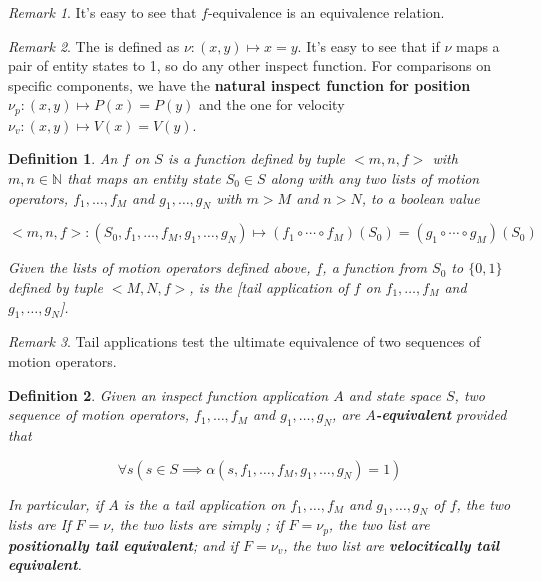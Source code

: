 \documentclass{book}
\newtheorem{definition}{Definition}
\theoremstyle{definition}\newtheorem{mechanism}{Mechanism}
\theoremstyle{remark}\newtheorem*{remark}{Remark}
\begin{document}
\begin{remark}
	It's easy to see that $f$-equivalence is an equivalence relation.
\end{remark}

\begin{remark}
	The  is defined as $\nu : (x, y) \mapsto x = y$. It's easy to see that if $\nu$ maps a pair of entity states to 1, so do any other inspect function. For comparisons on specific components, we have the {\bf{natural inspect function for position}} $\nu_p: (x, y) \mapsto P(x) = P(y)$ and the one for velocity $\nu_v: (x, y)\mapsto V(x) = V(y)$.
\end{remark}

\begin{definition}
	An  $f$ on $S$ is a function defined by tuple $<m, n, f>$ with $m, n \in \mathbb{N}$ that maps an entity state $S_0\in S$ along with any two lists of motion operators, $f_1, \dots, f_M$ and $g_1, \dots, g_N$ with $m > M$ and $n > N$, to a boolean value
	
	\begin{equation*}
		<m, n, f>: (S_0, f_1, \dots, f_M, g_1, \dots, g_N) \mapsto (f_1 \circ \cdots \circ f_M)(S_0) = (g_1 \circ \cdots \circ g_M)(S_0)
	\end{equation*}
	
	Given the lists of motion operators defined above, $\underline{f}$, a function from $S_0$ to $\{0, 1\}$ defined by tuple $<M, N, f>$, is the [tail application of $f$ on $f_1, \dots, f_M$ and $g_1, \dots, g_N$].
\end{definition}

\begin{remark}
	Tail applications test the ultimate equivalence of two sequences of motion operators.
\end{remark}

\begin{definition}
	Given an inspect function application $A$ and state space $S$, two sequence of motion operators, $f_1, \dots, f_M$ and $g_1, \dots, g_N$, are {\bf{$A$-equivalent}} provided that
	
	\begin{equation*}
		\forall s (s \in S \implies\alpha(s, f_1, \dots, f_M, g_1, \dots, g_N) = 1)
	\end{equation*}
	
	In particular, if $A$ is the a tail application on $f_1, \dots, f_M$ and $g_1, \dots, g_N$ of $f$, the two lists are  If $F = \nu$, the two lists are simply ; if $F = \nu_p$, the two list are {\bf{positionally tail equivalent}}; and if $F = \nu_v$, the two list are {\bf{velocitically tail equivalent}}.
\end{definition}
\end{document}
